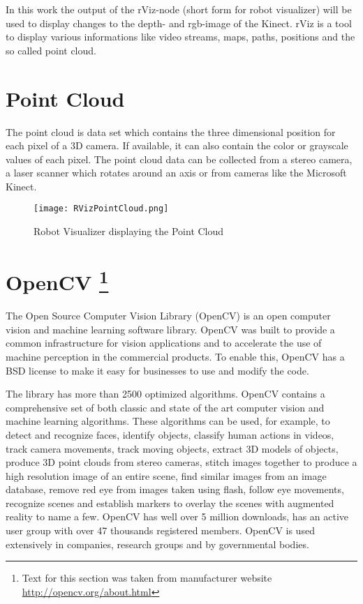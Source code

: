 In this work the output of the rViz-node (short form for robot visualizer) will be used to display changes to the depth- and 
rgb-image of the Kinect. rViz is a tool to display various informations like video streams, maps, paths, positions and the
so called point cloud.
\clearpage

\section{Point Cloud}
The point cloud is data set which contains the three dimensional position for each pixel of a 3D camera. 
If available, it can also contain the color or grayscale values of each pixel. 
The point cloud data can be collected from a stereo camera, a laser scanner which rotates around an axis or 
from cameras like the Microsoft Kinect.

\begin{figure}[htp]
	\centering
	\texttt{[image: RVizPointCloud.png]}
	\caption{Robot Visualizer displaying the Point Cloud}
	\label{figure:RVizPointCloud.png}
\end{figure}
\clearpage

\section[OpenCV]{OpenCV \footnote{Text for this section was taken from manufacturer website \url{http://opencv.org/about.html}\cite{willowgarage:opencv}}}

The Open Source Computer Vision Library (OpenCV) is an open computer vision and machine learning software library. OpenCV was built to provide a common infrastructure for vision applications and to accelerate the use of machine perception in the commercial products. To enable this, OpenCV has a BSD license to make it easy for businesses to use and modify the code.

The library has more than 2500 optimized algorithms. OpenCV contains a comprehensive set of both classic and state of the art computer vision and machine learning algorithms. These algorithms can be used, for example, to detect and recognize faces, identify objects, classify human actions in videos, track camera movements, track moving objects, extract 3D models of objects, produce 3D point clouds from stereo cameras, stitch images together to produce a high resolution image of an entire scene, find similar images from an image database, remove red eye from images taken using flash, follow eye movements, recognize scenes and establish markers to overlay the scenes with augmented reality to name a few. OpenCV has well over 5 million downloads, has an active user group with over 47 thousands registered members. OpenCV is used extensively in companies, research groups and by governmental bodies.

